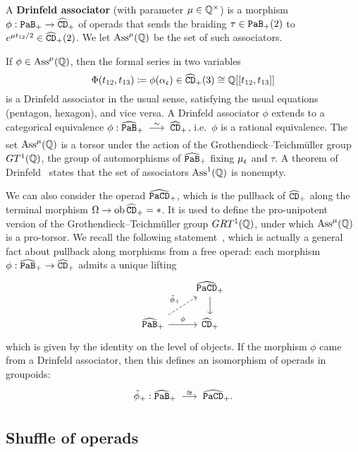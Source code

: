 \begin{definition}
  A \textbf{Drinfeld associator} (with parameter $\mu \in \mathbb{Q}^{\times}$) is a morphism $\phi : \mathtt{PaB}_{+} \to \widehat{\mathtt{CD}}_{+}$ of operads that sends the braiding $\tau \in \mathtt{PaB}_{+}(2)$ to $e^{\mu t_{12}/2} \in \widehat{\mathtt{CD}}_{+}(2)$.
  We let $\mathrm{Ass}^{\mu}(\mathbb{Q})$ be the set of such associators.
\end{definition}

If $\phi \in \mathrm{Ass}^{\mu}(\mathbb{Q})$, then the formal series in two variables
\[ \Phi(t_{12}, t_{13}) \coloneqq \phi(\alpha_{\mathfrak{c}}) \in \widehat{\mathtt{CD}}_{+}(3) \cong \mathbb{Q} [[ t_{12}, t_{13} ]] \]
is a Drinfeld associator in the usual sense, satisfying the usual equations (pentagon, hexagon), and vice versa.
A Drinfeld associator $\phi$ extends to a categorical equivalence $\phi : \PaBh_{+} \qiso \CDh_{+}$, i.e.\ $\phi$ is a rational equivalence.
The set $\mathrm{Ass}^{\mu}(\mathbb{Q})$ is a torsor under the action of the Grothendieck--Teichmüller group $GT^{1}(\mathbb{Q})$, the group of automorphisms of $\widehat{\mathtt{PaB}}_{+}$ fixing $\mu_{\mathfrak{c}}$ and $\tau$.
A theorem of Drinfeld~\cite{Drinfeld1990} states that the set of associators $\mathrm{Ass}^{1}(\mathbb{Q})$ is nonempty.

We can also consider the operad $\widehat{\mathtt{PaCD}}_{+}$, which is the pullback of $\widehat{\mathtt{CD}}_{+}$ along the terminal morphism $\Omega \to \operatorname{ob} \widehat{\mathtt{CD}}_{+} = *$.
It is used to define the pro-unipotent version of the Grothendieck--Teichmüller group $GRT^{1}(\mathbb{Q})$, under which $\mathrm{Ass}^{\mu}(\mathbb{Q})$ is a pro-torsor.
We recall the following statement~\cite{Fresse2017}, which is actually a general fact about pullback along morphisms from a free operad: each morphism $\phi : \widehat{\mathtt{PaB}}_{+} \to \widehat{\mathtt{CD}}_{+}$ admits a unique lifting
\[\begin{tikzcd}
    {} & \PaCDhp \dar \\
    \PaBh_{+} \urar[dashed]{\tilde\phi_{+}} \rar{\phi} & \CDh_{+}
  \end{tikzcd}\] which is given by the identity on the level of objects.
If the morphism $\phi$ came from a Drinfeld associator, then this defines an isomorphism of operads in groupoids:
\[ \tilde\phi_{+} : \PaBh_{+} \tkrightarrow{\cong} \PaCDhp. \]

\subsection{Shuffle of operads}
\label{sw.sec.shuffle-operads}

